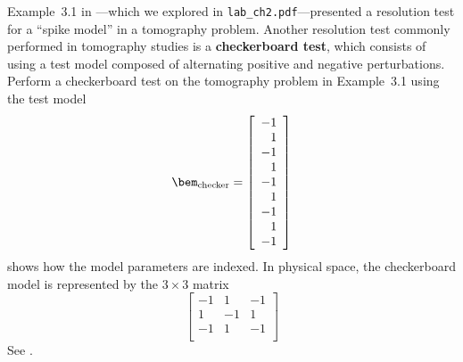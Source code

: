 \documentclass[11pt,titlepage,fleqn]{article}
\begin{document}
Example~3.1 in \citet{Aster}---which we explored in \verb+lab_ch2.pdf+---presented a resolution test for a ``spike model'' in a tomography problem.
Another resolution test commonly performed in tomography studies is a {\bf checkerboard test}, which consists of using a test model composed of alternating positive and negative perturbations. Perform a checkerboard test on the tomography problem in Example~3.1 using the test model
%
\begin{equation*}
\bem_{\rm checker} = \left[ \begin{array}{r}
     -1  \\  1 \\ -1 \\  1  \\ -1 \\  1 \\ -1  \\  1 \\ -1
\end{array} \right]
\end{equation*}
%
 shows how the model parameters are indexed. In physical space, the checkerboard model is represented by the $3 \times 3$ matrix
%
\begin{equation*}
\left[ \begin{array}{rrr}
     -1  &  1 & -1   \\
      1  & -1 &  1   \\
     -1  &  1 & -1   \\
\end{array} \right]
\end{equation*}
%
See .

\end{document}
